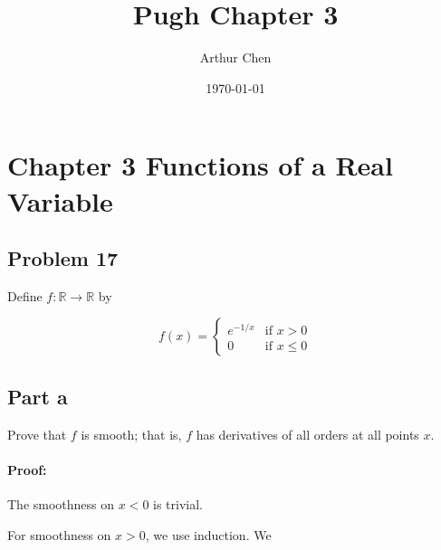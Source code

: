 \documentclass{article}
\author{Arthur Chen}
\title{Pugh Chapter 3}
\date{\today}
\newenvironment{proof}{\paragraph{Proof:}}{\hfill$\square$}
\begin{document}
\section*{Chapter 3 Functions of a Real Variable}

\subsection*{Problem 17}
Define $f: \mathbb{R} \rightarrow \mathbb{R}$ by

\[
f(x) = 
\begin{cases}
e^{-1/x} & \text{if } x > 0 \\
0 & \text{if } x \leq 0
\end{cases}
\]

\subsection*{Part a}
Prove that $f$ is smooth; that is, $f$ has derivatives of all orders at all points $x$.

\begin{proof}
The smoothness on $x < 0$ is trivial.

For smoothness on $x>0$, we use induction. We 
\end{document}
